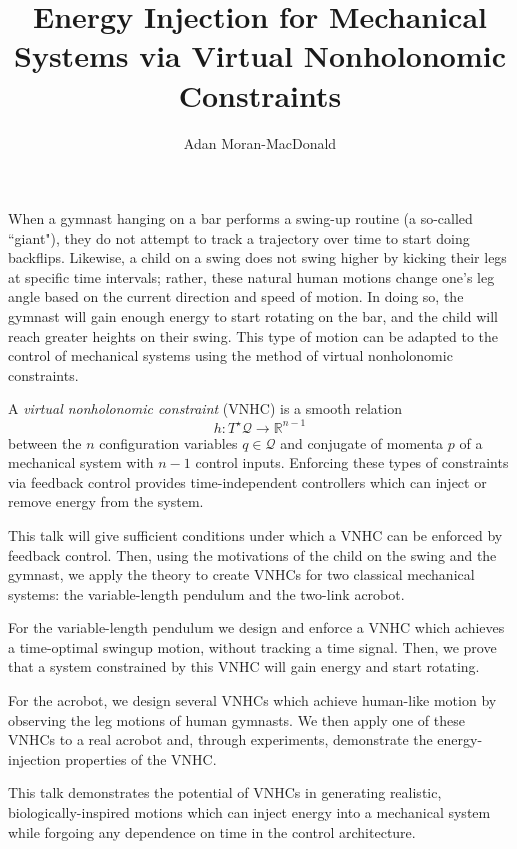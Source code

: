 \documentclass[12pt]{article}
\begin{document}
\title{Energy Injection for Mechanical Systems via Virtual Nonholonomic Constraints}
\author{Adan Moran-MacDonald}
\maketitle

When a gymnast hanging on a bar performs a swing-up routine (a so-called ``giant"),
they do not attempt to track a trajectory over time to start doing backflips.
Likewise, a child on a swing does not swing higher by kicking their legs at
specific time intervals; rather, these natural human motions change one's leg
angle based on the current direction and speed of motion. In doing so, the
gymnast will gain enough energy to start rotating on the bar, 
and the child will reach greater heights on their swing.
This type of motion can be adapted to the control of mechanical systems 
using the method of virtual nonholonomic constraints.

A \textit{virtual nonholonomic constraint} (VNHC) is a smooth relation 
\[
    h : T^\star \mathcal{Q} \rightarrow \mathbb{R}^{n-1}
\]
between the \(n\) configuration variables \(q \in \mathcal{Q}\) and conjugate of
momenta \(p\) of a mechanical system with \(n-1\) control inputs.
Enforcing these types of constraints via feedback control provides
time-independent controllers which can inject or remove energy from the system.

This talk will give sufficient conditions under which a VNHC 
can be enforced by feedback control.
Then, using the motivations of the child on the swing and the gymnast,
we apply the theory to create VNHCs for two classical mechanical systems:
the variable-length pendulum and the two-link acrobot. 

For the variable-length pendulum we design and enforce a VNHC which achieves a
time-optimal swingup motion, without tracking a time signal. 
Then, we prove that a system constrained by this VNHC will gain energy and start
rotating.

For the acrobot, we design several VNHCs which achieve human-like motion by
observing the leg motions of human gymnasts. We then apply one of these
VNHCs to a real acrobot and, through experiments, demonstrate the
energy-injection properties of the VNHC. 

This talk demonstrates the potential of VNHCs in generating realistic,
biologically-inspired motions which can inject energy into a mechanical system
while forgoing any dependence on time in the control architecture.

\newpage
\printbibliography
\end{document}

